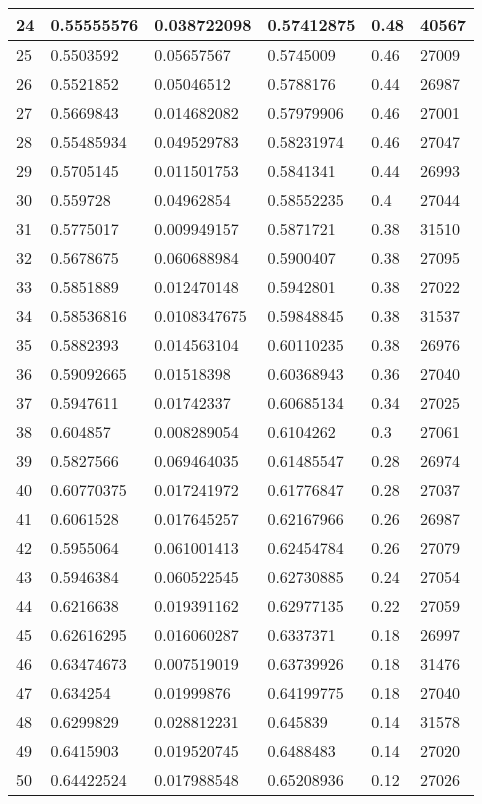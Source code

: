 \begin{longtable}{|l|l|l|l|l|l|}
24 & 0.55555576 & 0.038722098 & 0.57412875 & 0.48 & 40567 \\ \hline 
25 & 0.5503592 & 0.05657567 & 0.5745009 & 0.46 & 27009 \\ \hline 
26 & 0.5521852 & 0.05046512 & 0.5788176 & 0.44 & 26987 \\ \hline 
27 & 0.5669843 & 0.014682082 & 0.57979906 & 0.46 & 27001 \\ \hline 
28 & 0.55485934 & 0.049529783 & 0.58231974 & 0.46 & 27047 \\ \hline 
29 & 0.5705145 & 0.011501753 & 0.5841341 & 0.44 & 26993 \\ \hline 
30 & 0.559728 & 0.04962854 & 0.58552235 & 0.4 & 27044 \\ \hline 
31 & 0.5775017 & 0.009949157 & 0.5871721 & 0.38 & 31510 \\ \hline 
32 & 0.5678675 & 0.060688984 & 0.5900407 & 0.38 & 27095 \\ \hline 
33 & 0.5851889 & 0.012470148 & 0.5942801 & 0.38 & 27022 \\ \hline 
34 & 0.58536816 & 0.0108347675 & 0.59848845 & 0.38 & 31537 \\ \hline 
35 & 0.5882393 & 0.014563104 & 0.60110235 & 0.38 & 26976 \\ \hline 
36 & 0.59092665 & 0.01518398 & 0.60368943 & 0.36 & 27040 \\ \hline 
37 & 0.5947611 & 0.01742337 & 0.60685134 & 0.34 & 27025 \\ \hline 
38 & 0.604857 & 0.008289054 & 0.6104262 & 0.3 & 27061 \\ \hline 
39 & 0.5827566 & 0.069464035 & 0.61485547 & 0.28 & 26974 \\ \hline 
40 & 0.60770375 & 0.017241972 & 0.61776847 & 0.28 & 27037 \\ \hline 
41 & 0.6061528 & 0.017645257 & 0.62167966 & 0.26 & 26987 \\ \hline 
42 & 0.5955064 & 0.061001413 & 0.62454784 & 0.26 & 27079 \\ \hline 
43 & 0.5946384 & 0.060522545 & 0.62730885 & 0.24 & 27054 \\ \hline 
44 & 0.6216638 & 0.019391162 & 0.62977135 & 0.22 & 27059 \\ \hline 
45 & 0.62616295 & 0.016060287 & 0.6337371 & 0.18 & 26997 \\ \hline 
46 & 0.63474673 & 0.007519019 & 0.63739926 & 0.18 & 31476 \\ \hline 
47 & 0.634254 & 0.01999876 & 0.64199775 & 0.18 & 27040 \\ \hline 
48 & 0.6299829 & 0.028812231 & 0.645839 & 0.14 & 31578 \\ \hline 
49 & 0.6415903 & 0.019520745 & 0.6488483 & 0.14 & 27020 \\ \hline 
50 & 0.64422524 & 0.017988548 & 0.65208936 & 0.12 & 27026 \\ \hline 
\end{longtable}